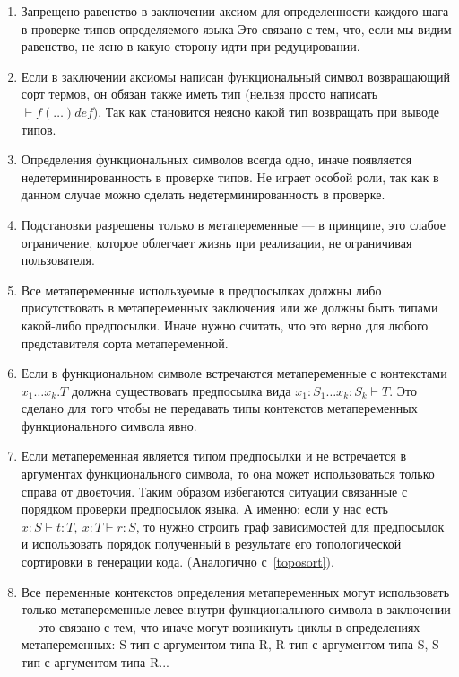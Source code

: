 \begin{enumerate}
\item Запрещено равенство в заключении аксиом для определенности каждого шага в проверке типов определяемого языка Это связано с тем, что, если мы видим равенство, не ясно в какую сторону идти при редуцировании.

\item Если в заключении аксиомы написан функциональный символ возвращающий сорт термов, он обязан также иметь тип (нельзя просто написать $ \vdash f(\ldots) def$). Так как становится неясно какой тип возвращать при выводе типов.

\item Определения функциональных символов всегда одно, иначе появляется недетерминированность в проверке типов. Не играет особой роли, так как в данном случае можно сделать недетерминированность в проверке.

\item Подстановки разрешены только в метапеременные --- в принципе, это слабое ограничение, которое облегчает жизнь при реализации, не ограничивая пользователя.

\item \label{tm:Meta} Все метапеременные используемые в предпосылках должны либо присутствовать в метапеременных заключения или же должны быть типами какой-либо предпосылки. Иначе нужно считать, что это верно для любого представителя сорта метапеременной.

\item Если в функциональном символе встречаются метапеременные с контекстами $x_1 \ldots x_k . T$ должна существовать предпосылка вида $x_1 : S_1 \ldots x_k : S_k  \vdash T$. Это сделано для того чтобы не передавать типы контекстов метапеременных функционального символа явно.

\item Если метапеременная является типом предпосылки и не встречается в аргументах функционального символа, то она может использоваться только справа от двоеточия. Таким образом избегаются ситуации связанные с порядком проверки предпосылок языка. А именно: если у нас есть $x : S \vdash t : T,\ x:T \vdash r : S$, то нужно строить граф зависимостей для предпосылок и использовать порядок полученный в результате его топологической сортировки в генерации кода. (Аналогично с~\ref{toposort}).

\item \label{order:Meta} Все переменные контекстов определения метапеременных могут использовать только метапеременные левее внутри функционального символа в заключении --- это связано с тем, что иначе могут возникнуть циклы в определениях метапеременных: S тип с аргументом типа R, R тип с аргументом типа S, S тип с аргументом типа R...


\end{enumerate}
